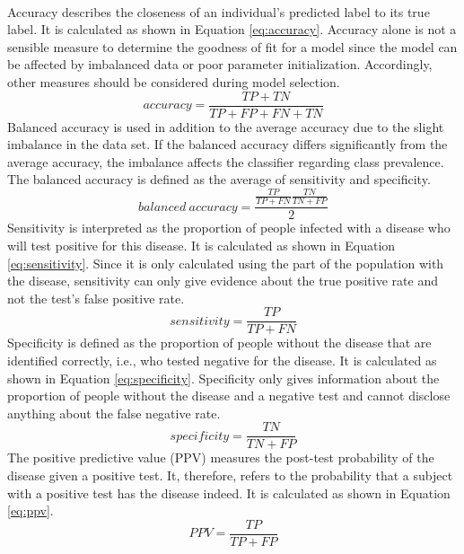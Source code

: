 \\
Accuracy describes the closeness of an individual's predicted label to its true 
label. It is calculated as shown in Equation \ref{eq:accuracy}. Accuracy alone 
is not a sensible measure to determine the goodness of fit for a model since 
the model can be affected by imbalanced data or poor parameter initialization. 
Accordingly, other measures should be considered during model 
selection.\cite{RN167}
\begin{equation}
 accuracy = \frac{TP + TN}{TP+FP+FN+TN}
 \label{eq:accuracy}
\end{equation}
Balanced accuracy is used in addition to the average accuracy due to the slight 
imbalance in the data set. If the balanced accuracy differs significantly from 
the average accuracy, the imbalance affects the classifier regarding 
class prevalence. The balanced accuracy is defined as the average of 
sensitivity and specificity. \cite{RN167, RN127}
\begin{equation}
 balanced \ accuracy = \frac{\frac{TP}{TP+FN}\frac{TN}{TN+FP}}{2}
 \label{eq:balanced_acc}
\end{equation}
Sensitivity is interpreted as the proportion of people infected with a disease 
who will test positive for this disease. It is calculated as shown in Equation 
\ref{eq:sensitivity}. Since it is only calculated using the part of the 
population with the disease, sensitivity can only give evidence about the true 
positive rate and not the test's false positive rate.\cite{RN168}
\begin{equation}
 sensitivity = \frac{TP}{TP+FN}
 \label{eq:sensitivity}
\end{equation}
Specificity is defined as the proportion of people without the disease that are 
identified correctly, i.e., who tested negative for the disease. It is 
calculated as shown in Equation \ref{eq:specificity}. Specificity only gives 
information about the proportion of people without the disease and a negative 
test and cannot disclose anything about the false negative 
rate.\cite{RN168}
\begin{equation}
 specificity = \frac{TN}{TN+FP}
 \label{eq:specificity}
\end{equation}
The positive predictive value (PPV) measures the post-test probability of the 
disease given a positive test. It, therefore, refers to the probability that a 
subject with a positive test has the disease indeed. It is calculated as shown 
in 
Equation \ref{eq:ppv}.\cite{RN168}
\begin{equation}
 PPV = \frac{TP}{TP+FP}
 \label{eq:ppv}
\end{equation}

